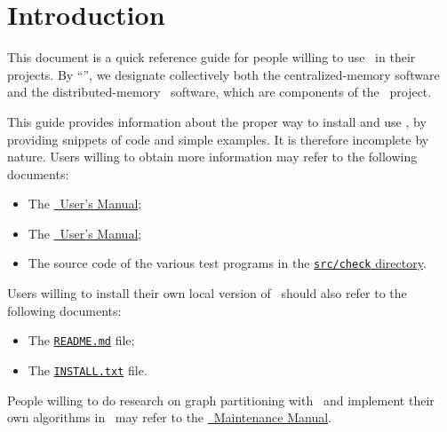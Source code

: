 
\section{Introduction}

This document is a quick reference guide for people willing to use
\scotch\ in their projects. By ``\scotch'', we designate collectively
both the centralized-memory software \scotch and the
distributed-memory \ptscotch\ software, which are components of the
\scotch\ project.

This guide provides information about the proper way to install and
use \scotch, by providing snippets of code and simple examples. It is
therefore incomplete by nature. Users willing to obtain more
information may refer to the following documents:
\begin{itemize}
\item
  The
  \href{https://gitlab.inria.fr/scotch/scotch/-/blob/master/doc/scotch_user7.0.pdf}{\scotch\ User's Manual};
\item
  The
  \href{https://gitlab.inria.fr/scotch/scotch/-/blob/master/doc/ptscotch_user7.0.pdf}{\ptscotch\ User's Manual};
\item
  The source code of the various test programs in the
  \href{https://gitlab.inria.fr/scotch/scotch/-/tree/master/src/check}{\texttt{src/check} directory}.
\end{itemize}

Users willing to install their own local version of \scotch\ should also
refer to the following documents:
\begin{itemize}
\item
  The \href{https://gitlab.inria.fr/scotch/scotch/-/blob/master/INSTALL.txt}{\texttt{README.md}} file;
\item
  The \href{https://gitlab.inria.fr/scotch/scotch/-/blob/master/INSTALL.txt}{\texttt{INSTALL.txt}} file.
\end{itemize}

People willing to do research on graph partitioning with \scotch\ and
implement their own algorithms in \scotch\ may refer to the
\href{https://gitlab.inria.fr/scotch/scotch/-/blob/master/doc/scotch_maint7.0.pdf}{\scotch\ Maintenance Manual}.
